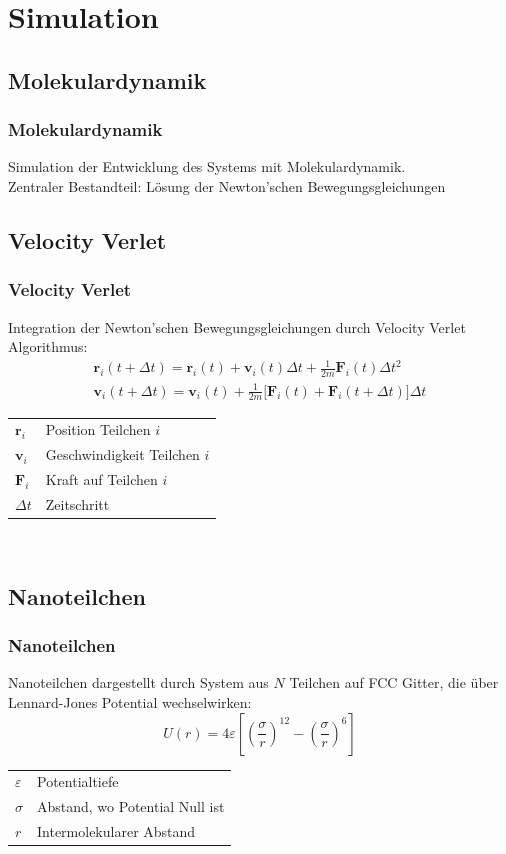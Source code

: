 \documentclass{beamer}
\begin{document}
\section{Simulation}
\subsection{Molekulardynamik}
\begin{frame}
\frametitle{Molekulardynamik}
Simulation der Entwicklung des Systems mit Molekulardynamik.\\
Zentraler Bestandteil: Lösung der Newton'schen Bewegungsgleichungen
\end{frame}

\subsection{Velocity Verlet}
\begin{frame}
\frametitle{Velocity Verlet}
Integration der Newton'schen Bewegungsgleichungen durch Velocity Verlet Algorithmus:
\begin{equation}
    \label{eq:velocityverlet}
    \begin{aligned}
        \mathbf{r}_i(t+\Delta t) = \mathbf{r}_i(t) + {\mathbf{v}}_i(t) \Delta t + \frac1{2m} {\mathbf{F}}_i(t) \Delta t^2\\
        \mathbf{v}_i(t+\Delta t) = \mathbf{v}_i(t) + \frac1{2m} \Big[\mathbf{F}_i(t) + \mathbf{F}_i(t+\Delta t)\Big] \Delta t
    \end{aligned}
\end{equation}
\begin{tabular}{l l}
$\mathbf{r}_i$ & Position Teilchen $i$\\
$\mathbf{v}_i$ & Geschwindigkeit Teilchen $i$\\
$\mathbf{F}_i$ & Kraft auf Teilchen $i$\\
$\Delta t$ & Zeitschritt\\
\end{tabular}\\
\end{frame}

\subsection{Nanoteilchen}

\begin{frame}
\frametitle{Nanoteilchen}
Nanoteilchen dargestellt durch System aus $N$ Teilchen auf FCC Gitter, die über Lennard-Jones Potential wechselwirken:
\begin{equation}
    \label{eq:lj}
    U(r) = 4\varepsilon\left[\left(\frac\sigma r\right)^{12} - \left(\frac\sigma r\right)^6\right]
\end{equation}
\begin{tabular}{l l}
$\varepsilon$ & Potentialtiefe\\
$\sigma$ & Abstand, wo Potential Null ist\\
$r$ & Intermolekularer Abstand\\
\end{tabular}\\
\end{frame}
\end{document}
